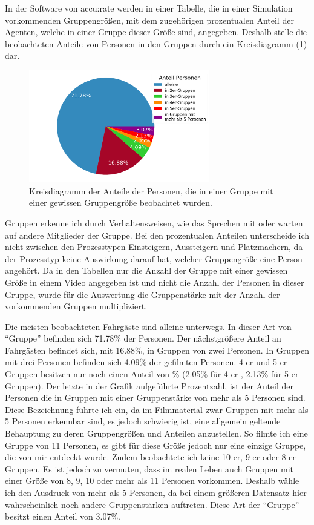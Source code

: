 In der Software von accu:rate werden in einer Tabelle, die in einer Simulation vorkommenden Gruppengrößen, mit dem zugehörigen prozentualen Anteil der Agenten, welche in einer Gruppe dieser Größe sind, angegeben. Deshalb stelle die beobachteten Anteile von Personen in den Gruppen durch ein Kreisdiagramm (\figurename \ref{fig:AnteileGruppen}) dar.
\begin{figure}[H]
	\centering
		\includegraphics[width=0.7\textwidth]{pictures/data_evaluation/groups/groups.png}
	\caption{Kreisdiagramm der Anteile der Personen, die in einer Gruppe mit einer gewissen Gruppengröße beobachtet wurden.}
	\label{fig:AnteileGruppen}
\end{figure}
Gruppen erkenne ich durch Verhaltensweisen, wie das Sprechen mit oder warten auf andere Mitglieder der Gruppe. Bei den prozentualen Anteilen unterscheide ich nicht zwischen den Prozesstypen Einsteigern, Aussteigern und Platzmachern, da der Prozesstyp keine Auswirkung darauf hat, welcher Gruppengröße eine Person angehört. Da in den Tabellen nur die Anzahl der Gruppe mit einer gewissen Größe in einem Video angegeben ist und nicht die Anzahl der Personen in dieser Gruppe, wurde für die Auswertung die Gruppenstärke mit der Anzahl der vorkommenden Gruppen multipliziert. 

Die meisten beobachteten Fahrgäste sind alleine unterwegs. In dieser Art von "`Gruppe"' befinden sich 71.78\% der Personen. Der nächstgrößere Anteil an Fahrgästen befindet sich, mit 16.88\%, in Gruppen von zwei Personen. In Gruppen mit drei Personen befinden sich 4.09\% der gefilmten Personen. 4-er und 5-er Gruppen besitzen nur noch einen Anteil von \% (2.05\% für 4-er-, 2.13\% für 5-er-Gruppen). Der letzte in der Grafik aufgeführte Prozentzahl, ist der Anteil der Personen die in Gruppen mit einer Gruppenstärke von mehr als 5 Personen sind. Diese Bezeichnung führte ich ein, da im Filmmaterial zwar Gruppen mit mehr als 5 Personen erkennbar sind, es jedoch schwierig ist, eine allgemein geltende Behauptung zu deren Gruppengrößen und Anteilen anzustellen. So filmte ich \zB eine Gruppe von 11 Personen, es gibt für diese Größe jedoch nur eine einzige Gruppe, die von mir entdeckt wurde. Zudem beobachtete ich keine 10-er, 9-er oder 8-er Gruppen. Es ist jedoch zu vermuten, dass im realen Leben auch Gruppen mit einer Größe von 8, 9, 10 oder mehr als 11 Personen vorkommen. Deshalb wähle ich den Ausdruck von mehr als 5 Personen, da bei einem größeren Datensatz hier wahrscheinlich noch andere Gruppenstärken auftreten. Diese Art der "`Gruppe"' besitzt einen Anteil von 3.07\%.

